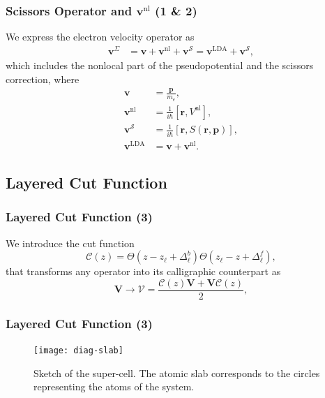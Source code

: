 \documentclass{beamer}
\begin{document}
\begin{frame}
\frametitle{Scissors Operator and
\texorpdfstring{$\mathbf{v}^{\mathrm{nl}}$}{vnl} (1 \& 2)} We express the
electron velocity operator as
\begin{equation*}\label{vop2}
\begin{split}
\mathbf{v}^{\Sigma}
&=\mathbf{v} + \mathbf{v}^{\mathrm{nl}} 
+ \mathbf{v}^{\mathcal{S}}
= \mathbf{v}^\mathrm{LDA} + \mathbf{v}^{\mathcal{S}},
\end{split}
\end{equation*}
which includes the nonlocal part of the pseudopotential and the scissors
correction, where
\begin{equation*}\label{conhr}
\begin{split}
\mathbf{v} &=\frac{\mathbf{p}}{m_{e}},\\
\mathbf{v}^{\mathrm{nl}} &= \frac{1}{i\hbar}
  \left[\mathbf{r},V^{\mathrm{nl}}\right],\\
\mathbf{v}^{\mathcal{S}} &= \frac{1}{i\hbar}
  \left[\mathbf{r},S(\mathbf{r},\mathbf{p})\right],\\
\mathbf{v}^\mathrm{LDA} &= \mathbf{v}+\mathbf{v}^{\mathrm{nl}}.
\end{split}
\end{equation*}  
\end{frame}



\subsection{Layered Cut Function}

\begin{frame}
\frametitle{Layered Cut Function (3)}
We introduce the cut function
\begin{equation*}
{\boldsymbol{\mathcal{C}}}(z)=\Theta(z-z_\ell+\Delta_\ell^{b})  
            \Theta(z_\ell-z+\Delta_\ell^f),
\label{sz}
\end{equation*}
that transforms any operator into its calligraphic counterpart as
\begin{equation*}
\mathbf{V} \to \boldsymbol{\mathcal{V}}
= \frac{\boldsymbol{\mathcal{C}}(z) \mathbf{V}
+ \mathbf{V} \boldsymbol{\mathcal{C}}(z)}{2},
\label{vcali}
\end{equation*} 
\end{frame}

\begin{frame}
\frametitle{Layered Cut Function (3)}
\begin{figure}
\centering
\texttt{[image: diag-slab]}
\caption{Sketch of the super-cell. The atomic slab corresponds to the circles
representing the atoms of the system.}
\end{figure}
\end{frame}
\end{document}
